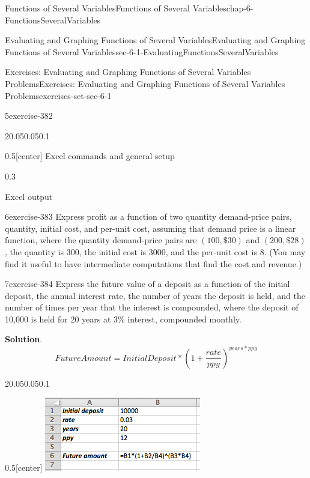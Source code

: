 \documentclass[oneside,10pt,]{book}
\numberwithin{equation}{section}
\begin{document}
\begin{chapterptx}{Functions of Several Variables}{}{Functions of Several Variables}{}{}{chap-6-FunctionsSeveralVariables}
\begin{sectionptx}{Evaluating and Graphing Functions of Several Variables}{}{Evaluating and Graphing Functions of Several Variables}{}{}{sec-6-1-EvaluatingFunctionsSeveralVariables}
\begin{exercises-subsection-numberless}{Exercises: Evaluating and Graphing Functions of Several Variables Problems}{}{Exercises: Evaluating and Graphing Functions of Several Variables Problems}{}{}{exercises-set-sec-6-1}
\begin{exercisegroup}
\begin{divisionexerciseeg}{5}{}{}{exercise-382}
\begin{sidebyside}{2}{0.05}{0.05}{0.1}
\begin{sbspanel}{0.5}[center]
Excel commands  and general setup%
\end{sbspanel}%
\begin{sbspanel}{0.3}%
\par
\hypertarget{p-2171}{}%
Excel output%
\end{sbspanel}%
\end{sidebyside}%
\end{divisionexerciseeg}%
\begin{divisionexerciseeg}{6}{}{}{exercise-383}%
\hypertarget{p-2172}{}%
Express profit as a function of two quantity demand-price pairs, quantity, initial cost, and per-unit cost, assuming that demand price is a linear function, where the quantity demand-price pairs are \((100, \$30)\) and \((200, \$28)\), the quantity is 300, the initial cost is \textdollar{}3000, and the per-unit cost is \textdollar{}8.  (You may find it useful to have intermediate computations that find the cost and revenue.)%
\end{divisionexerciseeg}%
\begin{divisionexerciseeg}{7}{}{}{exercise-384}%
\hypertarget{p-2173}{}%
Express the future value of a deposit as a function of the initial deposit, the annual interest rate, the number of years the deposit is held, and the number of times per year that the interest is compounded, where the deposit of \textdollar{}10,000 is held for 20 years at 3\% interest, compounded monthly.%
\par\smallskip%
\noindent\textbf{Solution}.\hypertarget{solution-193}{}\quad%
%
\begin{equation*}
FutureAmount=InitialDeposit*\left(1+\frac{rate}{ppy}\right)^{years*ppy}
\end{equation*}
\begin{sidebyside}{2}{0.05}{0.05}{0.1}%
\begin{sbspanel}{0.5}[center]%
\includegraphics[width=1\linewidth]{images/sec6-1-sol7a.png}

\end{sbspanel}
\end{sidebyside}
\end{divisionexerciseeg}
\end{exercisegroup}
\end{exercises-subsection-numberless}
\end{sectionptx}
\end{chapterptx}
\end{document}
